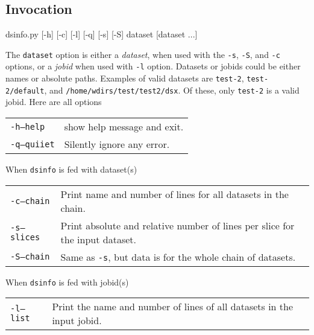 \subsection{Invocation}
\begin{shell}
dsinfo.py [-h] [-c] [-l] [-q] [-s] [-S] dataset [dataset ...]
\end{shell}
The \texttt{dataset} option is either a \textsl{dataset}, when used
with the \texttt{-s}, \texttt{-S}, and \texttt{-c} options, or a
\textsl{jobid} when used with \texttt{-l} option.  Datasets or jobids
could be either names or absolute paths.  Examples of valid datasets
are \texttt{test-2}, \texttt{test-2/default}, and
\texttt{/home/wdirs/test/test2/dsx}.  Of these, only \texttt{test-2}
is a valid jobid.  Here are all options
\begin{snugshade}
\begin{tabular}{p{4cm}p{9cm}}
  \texttt{-h}\hspace{3cm}\texttt{---help} & show help message and exit.\\[4ex]
  \texttt{-q}\hspace{3cm}\texttt{---quiiet} & Silently ignore any error.\\
\end{tabular}
\end{snugshade}
When \texttt{dsinfo} is fed with dataset(s)
\begin{snugshade}
\begin{tabular}{p{4cm}p{9cm}}
  \texttt{-c}\hspace{3cm}\texttt{---chain} & Print name and number of
  lines for all datasets in the chain.\\[4ex]
  \texttt{-s}\hspace{3cm}\texttt{---slices} & Print absolute and
  relative number of lines per slice for the input dataset.\\[4ex]
  \texttt{-S}\hspace{3cm}\texttt{---chain} & Same as \texttt{-s}, but
  data is for the whole chain of datasets.\\
\end{tabular}
\end{snugshade}
When \texttt{dsinfo} is fed with jobid(s)
\begin{snugshade}
\begin{tabular}{p{4cm}p{9cm}}
  \texttt{-l}\hspace{3cm}\texttt{---list} & Print the name and number
  of lines of all datasets in the input jobid.\\
\end{tabular}
\end{snugshade}

